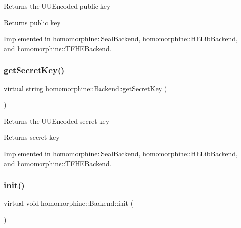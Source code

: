 Returns the U\+U\+Encoded public key

\begin{DoxyReturn}{Returns}
public key 
\end{DoxyReturn}


Implemented in \mbox{\hyperlink{classhomomorphine_1_1_seal_backend_aa2dce269303eaa73c62dbfacce66dc1a}{homomorphine\+::\+Seal\+Backend}}, \mbox{\hyperlink{classhomomorphine_1_1_h_e_lib_backend_a8b096d4780f3b65f0fa0cb3ca6cb9ab8}{homomorphine\+::\+H\+E\+Lib\+Backend}}, and \mbox{\hyperlink{classhomomorphine_1_1_t_f_h_e_backend_a8b8f0b1dbd4c7d663dd09fdb8af8624b}{homomorphine\+::\+T\+F\+H\+E\+Backend}}.

\mbox{\label{classhomomorphine_1_1_backend_a456cb97febfd3819ab400d9583c97153}} 
\subsubsection{\texorpdfstring{getSecretKey()}{getSecretKey()}}
{\footnotesize\ttfamily virtual string homomorphine\+::\+Backend\+::get\+Secret\+Key (\begin{DoxyParamCaption}{ }\end{DoxyParamCaption})\hspace{0.3cm}{\ttfamily [pure virtual]}}

Returns the U\+U\+Encoded secret key

\begin{DoxyReturn}{Returns}
secret key 
\end{DoxyReturn}


Implemented in \mbox{\hyperlink{classhomomorphine_1_1_seal_backend_a8ad57a68eb8a02d162ba439046565471}{homomorphine\+::\+Seal\+Backend}}, \mbox{\hyperlink{classhomomorphine_1_1_h_e_lib_backend_a57af39a901a44fef6aad76503739fde4}{homomorphine\+::\+H\+E\+Lib\+Backend}}, and \mbox{\hyperlink{classhomomorphine_1_1_t_f_h_e_backend_ac359c2ddee981c4daa989f5c34b0584e}{homomorphine\+::\+T\+F\+H\+E\+Backend}}.

\mbox{\label{classhomomorphine_1_1_backend_a8ac9e6b5d747ecd4db48d1bf1c1b7a8c}} 
\subsubsection{\texorpdfstring{init()}{init()}}
{\footnotesize\ttfamily virtual void homomorphine\+::\+Backend\+::init (\begin{DoxyParamCaption}{ }\end{DoxyParamCaption})\hspace{0.3cm}{\ttfamily [pure virtual]}}

